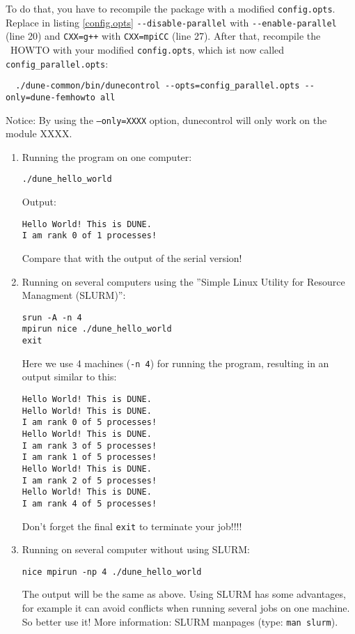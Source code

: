 To do that, you have to recompile the package with a modified \texttt{config.opts}. Replace in listing \ref{config.opts} \lstinline!--disable-parallel! with \lstinline!--enable-parallel! (line 20) and \lstinline!CXX=g++! with \lstinline!CXX=mpiCC! (line 27). After that, recompile the \Fem\ HOWTO with your modified \texttt{config.opts}, which ist now called \texttt{config\_parallel.opts}:
\begin{lstlisting}
  ./dune-common/bin/dunecontrol --opts=config_parallel.opts --only=dune-femhowto all
\end{lstlisting}
Notice: By using the \texttt{--only=XXXX} option, dunecontrol will only work on the module XXXX. 


\begin{enumerate}

\item Running the program on one computer:
\begin{lstlisting}
./dune_hello_world
\end{lstlisting}

Output:
\begin{lstlisting}
Hello World! This is DUNE.
I am rank 0 of 1 processes!
\end{lstlisting}
Compare that with the output of the serial version!

\item Running on several computers using the ''Simple Linux Utility for Resource Managment (SLURM)'':
\begin{lstlisting}
srun -A -n 4
mpirun nice ./dune_hello_world
exit
\end{lstlisting}
Here we use 4 machines (\lstinline!-n 4!) for running the program, resulting in an output similar to this:
\begin{lstlisting}
Hello World! This is DUNE.
Hello World! This is DUNE.
I am rank 0 of 5 processes!
Hello World! This is DUNE.
I am rank 3 of 5 processes!
I am rank 1 of 5 processes!
Hello World! This is DUNE.
I am rank 2 of 5 processes!
Hello World! This is DUNE.
I am rank 4 of 5 processes!
\end{lstlisting}
Don't forget the final \lstinline!exit! to terminate your job!!!!

\item Running on several computer without using SLURM:
\begin{lstlisting}
nice mpirun -np 4 ./dune_hello_world
\end{lstlisting}
The output will be the same as above. Using SLURM has some advantages, for example it can avoid conflicts when running several jobs on one machine. So better use it! More information: SLURM manpages (type: \lstinline!man slurm!).
\end{enumerate}

